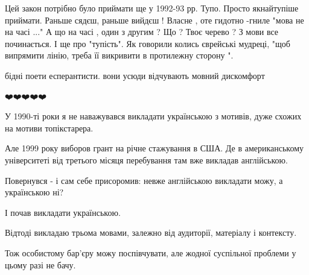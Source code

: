 \begin{itemize}
Цей закон потрібно було приймати ще у 1992-93 рр. Тупо. Просто якнайтупіше
приймати. Раньше сядєш, раньше вийдєш ! Власне , оте гидотно -гниле "мова не на
часі ..." А що на часі , один з другим ? Що ? Твоє черево ? З мови все
починається. І ще про "тупість". Як говорили колись єврейські мудреці, "щоб
випрямити лінію, треба її викривити в протилежну сторону ".

 
бідні поети есперантисти. вони усюди відчувають мовний дискомфорт

 
❤️❤️❤️❤️❤️

 

У 1990-ті роки я не наважувався викладати українською з мотивів, дуже схожих на
мотиви топікстарера.

Але 1999 року виборов грант на річне стажування в США. Де в американському
університеті від третього місяця перебування там вже викладав англійською.

Повернувся - і сам себе присоромив: невже англійською викладати можу, а
українською ні?

І почав викладати українською.

Відтоді викладаю трьома мовами, залежно від аудиторії, матеріалу і контексту.

Тож особистому бар'єру можу поспівчувати, але жодної суспільної проблеми у
цьому разі не бачу.

\begin{itemize}
 

\end{itemize}
\end{itemize}

